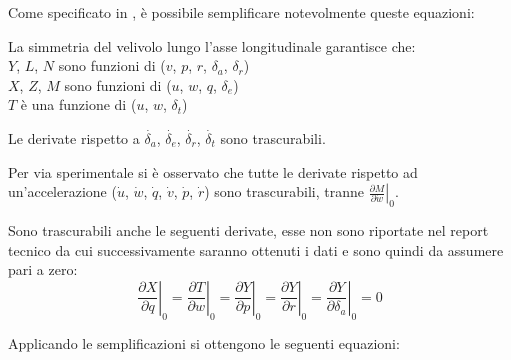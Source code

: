 Come specificato in \cite{bryson_control_spacecraft_aircraft}, è possibile semplificare notevolmente queste equazioni:
\begin{sitemize}
    \item La simmetria del velivolo lungo l'asse longitudinale garantisce che:\\
    $Y$, $L$, $N$ sono funzioni di ($v$, $p$, $r$, $\delta_a$, $\delta_r$)\\
    $X$, $Z$, $M$ sono funzioni di ($u$, $w$, $q$, $\delta_e$)\\
    $T$ è una funzione di ($u$, $w$, $\delta_t$)
    \item Le derivate rispetto a $\dot{\delta_a}$, $\dot{\delta_e}$, $\dot{\delta_r}$, $\dot{\delta_t}$ sono trascurabili.
    \item Per via sperimentale si è osservato che tutte le derivate rispetto ad un'accelerazione ($\dot{u}$, $\dot{w}$, $\dot{q}$, $\dot{v}$, $\dot{p}$, $\dot{r}$) sono trascurabili, tranne $\left.\frac{\partial M}{\partial \dot{w}}\right|_0$.
    \item Sono trascurabili anche le seguenti derivate, esse non sono riportate nel report tecnico \cite{heffley_handling_qualities} da cui successivamente saranno ottenuti i dati e sono quindi da assumere pari a zero:
    \begin{equation*}
        \left.\frac{\partial X}{\partial q}\right|_0 = \left.\frac{\partial T}{\partial w}\right|_0 = \left.\frac{\partial Y}{\partial p}\right|_0 = \left.\frac{\partial Y}{\partial r}\right|_0 = \left.\frac{\partial Y}{\partial \delta_a}\right|_0 = 0
    \end{equation*}
\end{sitemize}

Applicando le semplificazioni si ottengono le seguenti equazioni:

